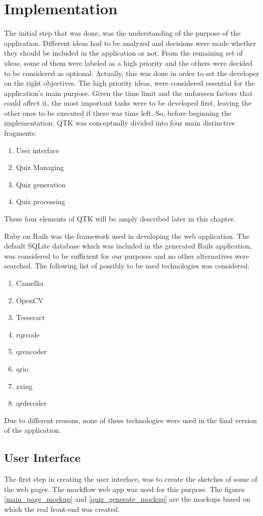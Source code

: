 \section{Implementation}
The initial step that was done, was the understanding of the purpose of the application. Different ideas had to be analyzed and decisions were made whether they should be included in the application or not. From the remaining set of ideas, some of them were labeled as a high priority and the others were decided to be considered as optional. Actually, this was done in order to set the developer on the right objectives. The high priority ideas, were considered essential for the application's main purpose. Given the time limit and the unforseen factors that could affect it, the most important tasks were to be developed first, leaving the other ones to be executed if there was time left. So, before beginning the implementation, QTK was conceptually divided into four main distinctive fragments:
\begin{enumerate}
  \item {User interface}
  \item {Quiz Managing}
  \item {Quiz generation}
  \item {Quiz processing}
\end{enumerate}

These four elements of QTK will be amply described later in this chapter.

Ruby on Rails was the framework used in developing the web application. The default SQLite database which was included in the generated Rails application, was considered to be sufficient for our purposes and no other alternatives were searched. The following list of possibly to be used technologies was considered:
\begin{enumerate}
  \item Camellia
  \item OpenCV
  \item Tesseract
  \item rqrcode
  \item qrencoder
  \item qrio
  \item zxing
  \item qrdecoder
\end{enumerate}
Due to different reasons, none of these technologies were used in the final version of the application.

\subsection{User Interface}
The first step in creating the user interface, was to create the sketches of some of the web pages. The mockflow web app \cite{mockflow} was used for this purpose. The figures \ref{main_page_mockup} and \ref{quiz_generate_mockup} are the mockups based on which the real front-end was created.

